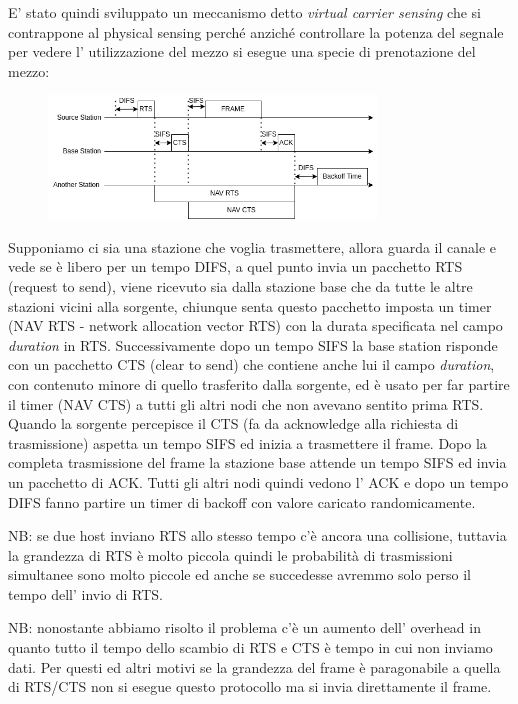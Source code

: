 E' stato quindi sviluppato un meccanismo detto \emph{virtual carrier sensing} che si contrappone al physical sensing perché anziché controllare la potenza del segnale per vedere l' utilizzazione del mezzo si esegue una specie di prenotazione del mezzo:
\begin{figure}[H]
    \centering
    \includegraphics[width=330px]{images/8_Wireless_Mobile/virtual_carrier_sensing.png}
\end{figure}
Supponiamo ci sia una stazione che voglia trasmettere, allora guarda il canale e vede se è libero per un tempo DIFS, a quel punto invia un pacchetto RTS (request to send), viene ricevuto sia dalla stazione base che da tutte le altre stazioni vicini alla sorgente, chiunque senta questo pacchetto imposta un timer (NAV RTS - network allocation vector RTS) con la durata specificata nel campo \emph{duration} in RTS.
Successivamente dopo un tempo SIFS la base station risponde con un pacchetto CTS (clear to send) che contiene anche lui il campo \emph{duration}, con contenuto minore di quello trasferito dalla sorgente, ed è usato per far partire il timer (NAV CTS) a tutti gli altri nodi che non avevano sentito prima RTS.
Quando la sorgente percepisce il CTS (fa da acknowledge alla richiesta di trasmissione) aspetta un tempo SIFS ed inizia a trasmettere il frame.
Dopo la completa trasmissione del frame la stazione base attende un tempo SIFS ed invia un pacchetto di ACK.
Tutti gli altri nodi quindi vedono l' ACK e dopo un tempo DIFS fanno partire un timer di backoff con valore caricato randomicamente.

NB: se due host inviano RTS allo stesso tempo c'è ancora una collisione, tuttavia la grandezza di RTS è molto piccola quindi le probabilità di trasmissioni simultanee sono molto piccole ed anche se succedesse avremmo solo perso il tempo dell' invio di RTS.

NB: nonostante abbiamo risolto il problema c'è un aumento dell' overhead in quanto tutto il tempo dello scambio di RTS e CTS è tempo in cui non inviamo dati.
Per questi ed altri motivi se la grandezza del frame è paragonabile a quella di RTS/CTS non si esegue questo protocollo ma si invia direttamente il frame.

